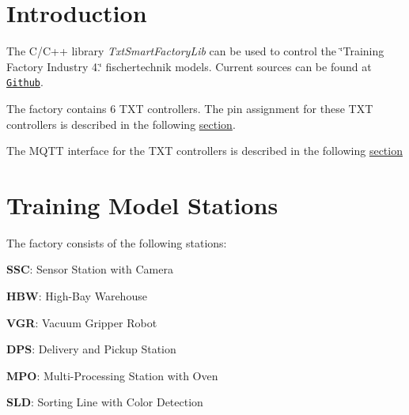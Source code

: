 \section*{Introduction }

The C/\+C++ library {\itshape Txt\+Smart\+Factory\+Lib} can be used to control the \char`\"{}\+Training Factory Industry 4.\char`\"{} fischertechnik models. Current sources can be found at \href{https://www.github.com/fischertechnik}{\tt Github}.

The factory contains 6 T\+XT controllers. The pin assignment for these T\+XT controllers is described in the following \hyperlink{md_PinAssignmentTXT}{section}.

The M\+Q\+TT interface for the T\+XT controllers is described in the following \hyperlink{md_MqttInterface}{section}

\section*{Training Model Stations}

The factory consists of the following stations\+:
\begin{DoxyItemize}
\item {\bfseries S\+SC}\+: Sensor Station with Camera
\item {\bfseries H\+BW}\+: High-\/\+Bay Warehouse
\item {\bfseries V\+GR}\+: Vacuum Gripper Robot
\item {\bfseries D\+PS}\+: Delivery and Pickup Station
\item {\bfseries M\+PO}\+: Multi-\/\+Processing Station with Oven
\item {\bfseries S\+LD}\+: Sorting Line with Color Detection 
\end{DoxyItemize}